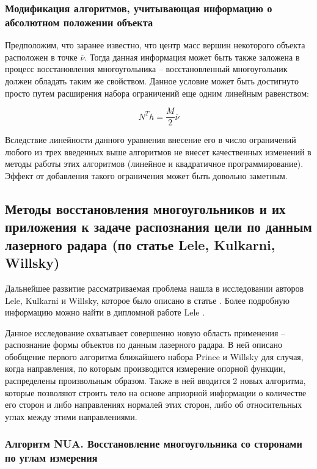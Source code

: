 \documentclass[a4paper, 12pt, titlepage]{article}
\theoremstyle{definition}
\theoremstyle{plain}
\begin{document}
\subsubsection{Модификация алгоритмов, учитывающая информацию о абсолютном
положении объекта}
\label{sec:history/PrinceW90/algo-SHIFT-CORRECT}

Предположим, что заранее известно, что центр масс вершин некоторого объекта
расположен в точке $\overline{\nu}$. Тогда данная информация может быть также
заложена в процесс восстановления многоугольника -- восстановленный
многоугольник должен обладать таким же свойством. Данное условие может быть
достигнуто просто путем расширения набора ограничений еще одним линейным
равенством:

\begin{equation}
N^{T} h = \frac{M}{2} \overline{\nu}
\end{equation}

Вследствие линейности данного уравнения внесение его в число ограничений любого
из трех введенных выше алгоритмов не внесет качественных изменений в методы
работы этих алгоритмов (линейное и квадратичное программирование). Эффект от
добавления такого ограничения может быть довольно заметным.

\newpage
\subsection{Методы восстановления многоугольников и их приложения к
задаче распознания цели по данным лазерного радара (по статье Lele, Kulkarni,
Willsky)}
\label{sec:history/LeleKW92}

Дальнейшее развитие рассматриваемая проблема нашла в исследовании авторов Lele,
Kulkarni и Willsky, которое было описано в статье
\cite{journals/josaa/LeleKW92}. Более подробную информацию можно найти в
дипломной работе Lele \cite{thesis/Lele90}.

Данное исследование охватывает совершенно новую область применения --
распознание формы объектов по данным лазерного радара. В ней описано обобщение
первого алгоритма ближайшего набора Prince и Willsky для случая, когда
направления, по которым производится измерение опорной функции, распределены
произвольным образом. Также в ней вводится 2 новых алгоритма, которые позволяют
строить тело на основе априорной информации о количестве его сторон и
либо направлениях нормалей этих сторон, либо об относительных углах между этими
направлениями.

\subsubsection{Алгоритм NUA. Восстановление многоугольника со сторонами по
углам измерения}
\label{sec:history/LeleKW92/algo-NUA}
\end{document}
